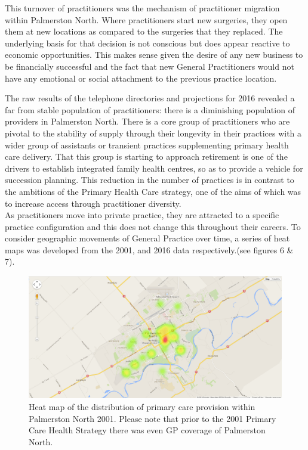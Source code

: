 \documentclass[11pt,a4paper]{article}
\begin{document}
This turnover of practitioners was the mechanism of practitioner migration within Palmerston North. Where practitioners start new surgeries, they open them at new locations as compared to the surgeries that they replaced. The underlying basis for that decision is not conscious but does appear reactive to economic opportunities. This makes sense given the desire of any new business to be financially successful and the fact that new General Practitioners would not have any emotional or social attachment to the previous practice location.

The raw results of the telephone directories and projections for 2016 revealed a far from stable population of practitioners: there is a diminishing population of providers in Palmerston North. There is a core group of practitioners who are pivotal to the stability of supply through their longevity in their practices with a wider group of assistants or transient practices supplementing primary health care delivery. That this group is starting to approach retirement is one of the drivers to establish integrated family health centres, so as to provide a vehicle for succession planning. This reduction in the number of practices is in contrast to the ambitions of the Primary Health Care strategy, one of the aims of which was to increase access through practitioner diversity.  \\

As practitioners move into private practice, they are attracted to a specific practice configuration and this does not change this throughout their careers. To consider geographic movements of General Practice over time, a series of heat maps was developed from the 2001, and 2016 data respectively.(see figures 6 \& 7).\\ 

\begin{figure}[htp]
\centering
\includegraphics[scale=0.3]{fig6.png}
\caption{Heat map of the distribution of primary care provision within Palmerston North 2001. Please note that prior to the 2001 Primary Care Health Strategy there was even GP coverage of Palmerston North.}
\label{Heat map of practitioners 2001}
\end{figure}  
\end{document}
